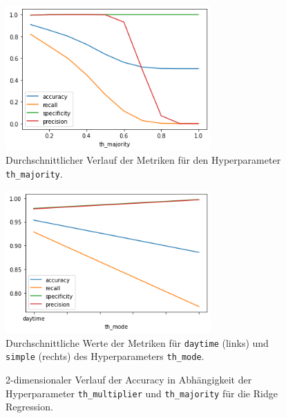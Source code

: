 \begin{figure}
    \centering
    \includegraphics[width=0.7\textwidth]{res/res-th-majority}
    \caption{Durchschnittlicher Verlauf der Metriken für den Hyperparameter \texttt{th\_majority}.}
    \label{fig:res-th-majority}
\end{figure}

\begin{figure}
    \centering
    \includegraphics[width=0.7\textwidth]{res/res-th-mode}
    \caption{Durchschnittliche Werte der Metriken für \texttt{daytime} (links) und
        \texttt{simple} (rechts) des Hyperparameters \texttt{th\_mode}.}
    \label{fig:res-th-mode}
\end{figure}

\begin{figure}
    \centering
    \caption{2-dimensionaler Verlauf der Accuracy in Abhängigkeit der Hyperparameter \texttt{th\_multiplier} und
        \texttt{th\_majority} für die Ridge Regression.}
    \label{fig:res-th-multiplier}
\end{figure}

